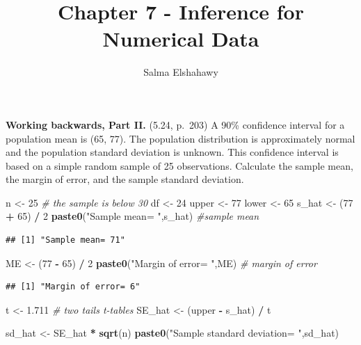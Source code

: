 \documentclass[]{article}
\title{Chapter 7 - Inference for Numerical Data}
\author{Salma Elshahawy}
\date{}
\newenvironment{Shaded}{\begin{snugshade}}{\end{snugshade}}
\newcommand{\CommentTok}[1]{\textcolor[rgb]{0.56,0.35,0.01}{\textit{#1}}}
\newcommand{\DecValTok}[1]{\textcolor[rgb]{0.00,0.00,0.81}{#1}}
\newcommand{\FloatTok}[1]{\textcolor[rgb]{0.00,0.00,0.81}{#1}}
\newcommand{\KeywordTok}[1]{\textcolor[rgb]{0.13,0.29,0.53}{\textbf{#1}}}
\newcommand{\NormalTok}[1]{#1}
\newcommand{\OperatorTok}[1]{\textcolor[rgb]{0.81,0.36,0.00}{\textbf{#1}}}
\newcommand{\StringTok}[1]{\textcolor[rgb]{0.31,0.60,0.02}{#1}}
\begin{document}
\maketitle

\textbf{Working backwards, Part II.} (5.24, p.~203) A 90\% confidence
interval for a population mean is (65, 77). The population distribution
is approximately normal and the population standard deviation is
unknown. This confidence interval is based on a simple random sample of
25 observations. Calculate the sample mean, the margin of error, and the
sample standard deviation.

\begin{Shaded}
\begin{Highlighting}[]
\NormalTok{n <-}\StringTok{ }\DecValTok{25} \CommentTok{# the sample is below 30}
\NormalTok{df <-}\StringTok{ }\DecValTok{24}
\NormalTok{upper <-}\StringTok{ }\DecValTok{77}
\NormalTok{lower <-}\StringTok{ }\DecValTok{65}
\NormalTok{s_hat <-}\StringTok{ }\NormalTok{(}\DecValTok{77} \OperatorTok{+}\StringTok{ }\DecValTok{65}\NormalTok{) }\OperatorTok{/}\StringTok{ }\DecValTok{2}
\KeywordTok{paste0}\NormalTok{(}\StringTok{"Sample mean= "}\NormalTok{,s_hat) }\CommentTok{#sample mean}
\end{Highlighting}
\end{Shaded}

\begin{verbatim}
## [1] "Sample mean= 71"
\end{verbatim}

\begin{Shaded}
\begin{Highlighting}[]
\NormalTok{ME <-}\StringTok{ }\NormalTok{(}\DecValTok{77} \OperatorTok{-}\StringTok{ }\DecValTok{65}\NormalTok{) }\OperatorTok{/}\StringTok{ }\DecValTok{2}
\KeywordTok{paste0}\NormalTok{(}\StringTok{"Margin of error= "}\NormalTok{,ME) }\CommentTok{# margin of error}
\end{Highlighting}
\end{Shaded}

\begin{verbatim}
## [1] "Margin of error= 6"
\end{verbatim}

\begin{Shaded}
\begin{Highlighting}[]
\NormalTok{t <-}\StringTok{ }\FloatTok{1.711} \CommentTok{# two tails t-tables }
\NormalTok{SE_hat <-}\StringTok{ }\NormalTok{(upper }\OperatorTok{-}\StringTok{ }\NormalTok{s_hat) }\OperatorTok{/}\StringTok{ }\NormalTok{t}

\NormalTok{sd_hat <-}\StringTok{ }\NormalTok{SE_hat }\OperatorTok{*}\StringTok{ }\KeywordTok{sqrt}\NormalTok{(n)}
\KeywordTok{paste0}\NormalTok{(}\StringTok{"Sample standard deviation= "}\NormalTok{,sd_hat)}
\end{Highlighting}
\end{Shaded}
\end{document}
